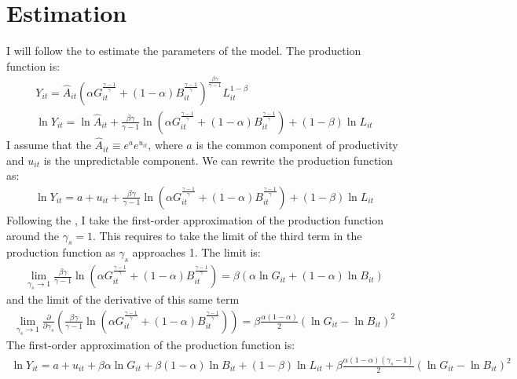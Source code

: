 \documentclass[12pt]{article} %
\begin{document}
\section*{Estimation}
I will follow the \cite{kmenta1967estimation} to estimate the parameters of the model. The production function is:
\begin{gather*}
    Y_{it} = \hat{A}_{it}(
        \alpha G_{it}^{\frac{\gamma-1}{\gamma}} + (1-\alpha) B_{it}^{\frac{\gamma-1}{\gamma}}
    ) ^ {\frac{\beta\gamma}{\gamma-1}} L_{it}^{1-\beta}\\
    \ln Y_{it} = \ln \hat{A}_{it} + \frac{\beta\gamma}{\gamma-1} \ln(
        \alpha G_{it}^{\frac{\gamma-1}{\gamma}} + (1-\alpha) B_{it}^{\frac{\gamma-1}{\gamma}}
    ) + (1-\beta) \ln L_{it}
\end{gather*}
I assume that the $\hat{A}_{it} \equiv e^a e^{u_{it}}$, where $a$ is the common component of productivity and $u_{it}$ is the unpredictable component. We can rewrite the production function as:
\begin{gather*}
    \ln Y_{it} = a + u_{it} + \frac{\beta\gamma}{\gamma-1} \ln(
        \alpha G_{it}^{\frac{\gamma-1}{\gamma}} + (1-\alpha) B_{it}^{\frac{\gamma-1}{\gamma}}
    ) + (1-\beta) \ln L_{it}
\end{gather*}
Following the \cite{kmenta1967estimation}, I take the first-order approximation of the production function around the $\gamma_s = 1$. This requires to take the limit of the third term in the production function as $\gamma_s$ approaches 1. The limit is:
\begin{gather*}
    \lim_{\gamma_s \to 1} \frac{\beta\gamma}{\gamma-1} \ln(
        \alpha G_{it}^{\frac{\gamma-1}{\gamma}} + (1-\alpha) B_{it}^{\frac{\gamma-1}{\gamma}}
    ) = \beta (\alpha \ln G_{it}   + (1-\alpha)\ln B_{it} )
\end{gather*}
and the limit of the derivative of this same term
\begin{gather*}
    \lim_{\gamma_s \to 1} \frac{\partial}{\partial \gamma_s} \left( \frac{\beta\gamma}{\gamma-1} \ln(
        \alpha G_{it}^{\frac{\gamma-1}{\gamma}} + (1-\alpha) B_{it}^{\frac{\gamma-1}{\gamma}}
    ) \right) = \beta \frac{\alpha (1-\alpha)}{2}(\ln G_{it} - \ln B_{it})^2
\end{gather*}
The first-order approximation of the production function is:
\begin{gather*}
    \ln Y_{it} = a + u_{it} +  \beta\alpha \ln G_{it}   + \beta(1-\alpha)\ln B_{it} + (1-\beta) \ln L_{it} + \beta \frac{\alpha (1-\alpha)(\gamma_s - 1)}{2}(\ln G_{it} - \ln B_{it})^2
\end{gather*}
\end{document}
